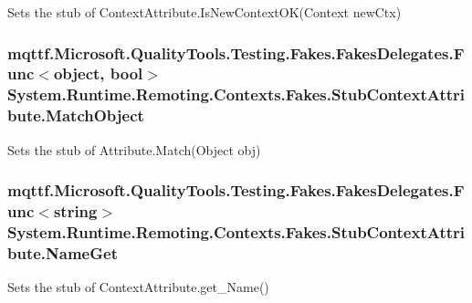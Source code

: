 Sets the stub of Context\-Attribute.\-Is\-New\-Context\-O\-K(\-Context new\-Ctx)

\hypertarget{class_system_1_1_runtime_1_1_remoting_1_1_contexts_1_1_fakes_1_1_stub_context_attribute_a7707e10cade24f424d8a6964cf18e7f8}{
\subsubsection[{Match\-Object}]{\setlength{\rightskip}{0pt plus 5cm}mqttf.\-Microsoft.\-Quality\-Tools.\-Testing.\-Fakes.\-Fakes\-Delegates.\-Func$<$object, bool$>$ System.\-Runtime.\-Remoting.\-Contexts.\-Fakes.\-Stub\-Context\-Attribute.\-Match\-Object}}\label{class_system_1_1_runtime_1_1_remoting_1_1_contexts_1_1_fakes_1_1_stub_context_attribute_a7707e10cade24f424d8a6964cf18e7f8}


Sets the stub of Attribute.\-Match(\-Object obj)

\hypertarget{class_system_1_1_runtime_1_1_remoting_1_1_contexts_1_1_fakes_1_1_stub_context_attribute_a62dec0f497a84de870fbfd8187844bf1}{
\subsubsection[{Name\-Get}]{\setlength{\rightskip}{0pt plus 5cm}mqttf.\-Microsoft.\-Quality\-Tools.\-Testing.\-Fakes.\-Fakes\-Delegates.\-Func$<$string$>$ System.\-Runtime.\-Remoting.\-Contexts.\-Fakes.\-Stub\-Context\-Attribute.\-Name\-Get}}\label{class_system_1_1_runtime_1_1_remoting_1_1_contexts_1_1_fakes_1_1_stub_context_attribute_a62dec0f497a84de870fbfd8187844bf1}


Sets the stub of Context\-Attribute.\-get\-\_\-\-Name()

